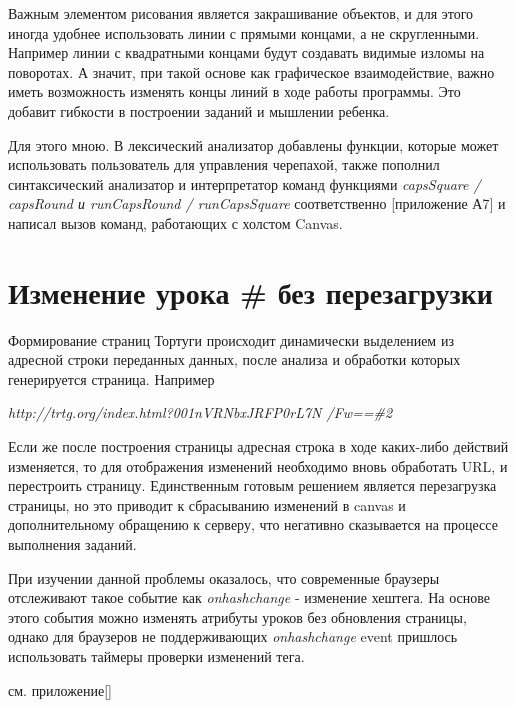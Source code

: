 Важным элементом рисования является закрашивание объектов, и для этого иногда удобнее использовать линии с прямыми концами, а не скругленными. Например линии с квадратными концами будут создавать видимые изломы на поворотах. А значит, при такой основе как графическое взаимодействие, важно иметь возможность  изменять  концы линий в ходе работы программы. Это добавит гибкости в построении заданий и мышлении ребенка.


Для этого мною. В лексический анализатор  добавлены функции, которые может использовать пользователь для управления черепахой, также пополнил синтаксический анализатор и интерпретатор команд функциями \textit{capsSquare / capsRound и runCapsRound / runCapsSquare} соответственно [приложение А7] и написал вызов команд, работающих с холстом Canvas.

\section{Изменение урока \# без перезагрузки} \label{sect1_1}


Формирование страниц Тортуги происходит динамически выделением из адресной строки переданных данных, после анализа и обработки которых генерируется страница.
Например 
 
 \begin{center}
 \vspace{6mm}
  \textit{ http://trtg.org/index.html?001nVRNbxJRFP0rL7N /Fw==\#2 }
 \end{center} 
 \vspace{6mm}
 
Если же после построения страницы адресная строка в ходе каких-либо действий изменяется, то для отображения изменений необходимо вновь обработать URL, и  перестроить страницу. Единственным готовым решением является  перезагрузка страницы, но это приводит к сбрасыванию изменений в canvas и дополнительному обращению к серверу, что негативно сказывается на процессе выполнения заданий. 

При изучении данной проблемы оказалось, что современные браузеры отслеживают такое событие как  \textit{onhashchange} - изменение хештега. На основе этого события  можно изменять атрибуты уроков без  обновления страницы, однако для браузеров не поддерживающих \textit{onhashchange} event пришлось использовать таймеры проверки изменений тега.

см. приложение[]

